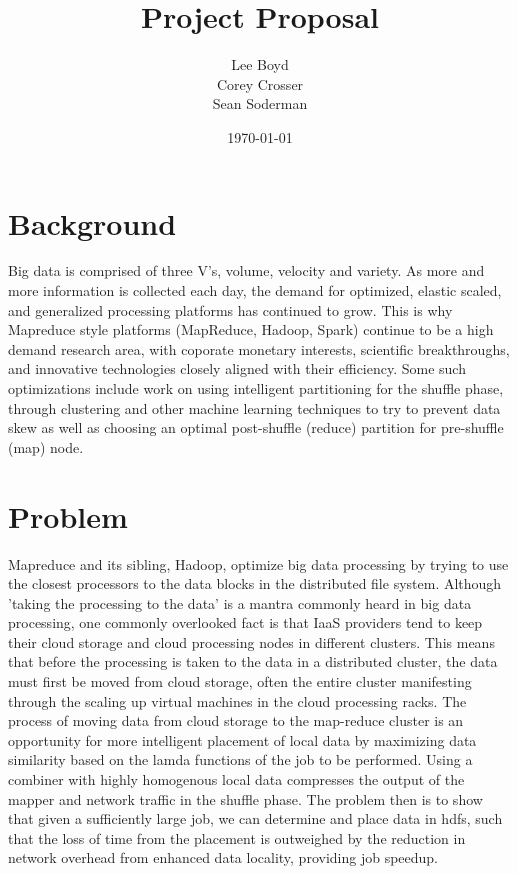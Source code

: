 \documentclass[14pt]{extarticle}
\begin{document}
\title{Project Proposal}
\author{Lee Boyd \\
        Corey Crosser \\
        Sean Soderman}
\date{\today}
\maketitle

\section{Background}
Big data is comprised of three V's, volume, velocity and variety. As more and more information is collected each day, the demand for optimized, elastic scaled, and generalized processing platforms has continued to grow. This is why Mapreduce style platforms (MapReduce, Hadoop, Spark) continue to be a high demand research area, with coporate monetary interests, scientific breakthroughs, and innovative technologies closely aligned with their efficiency.  Some such optimizations include work on using intelligent partitioning for the shuffle phase, through clustering and other machine learning techniques to try to prevent data skew as well as choosing an optimal post-shuffle (reduce) partition for pre-shuffle (map) node.  


\section{Problem}
Mapreduce and its sibling, Hadoop, optimize big data processing by trying to use the closest processors to the data blocks in the distributed file system.  Although 'taking the processing to the data' is a mantra commonly heard in big data processing, one commonly overlooked fact is that IaaS providers tend to keep their cloud storage and cloud processing nodes in different clusters.  This means that before the processing is taken to the data in a distributed cluster, the data must first be moved from cloud storage, often the entire cluster manifesting through the scaling up virtual machines in the cloud processing racks.  The process of moving data from cloud storage to the map-reduce cluster is an opportunity for more intelligent placement of local data by maximizing data similarity based on the lamda functions of the job to be performed.  Using a combiner with highly homogenous local data compresses the output of the mapper and network traffic in the shuffle phase.  The problem then is to show that given a sufficiently large job, we can determine and place data in hdfs, such that the loss of time from the placement is outweighed by the reduction in network overhead from enhanced data locality, providing job speedup.
\end{document}
